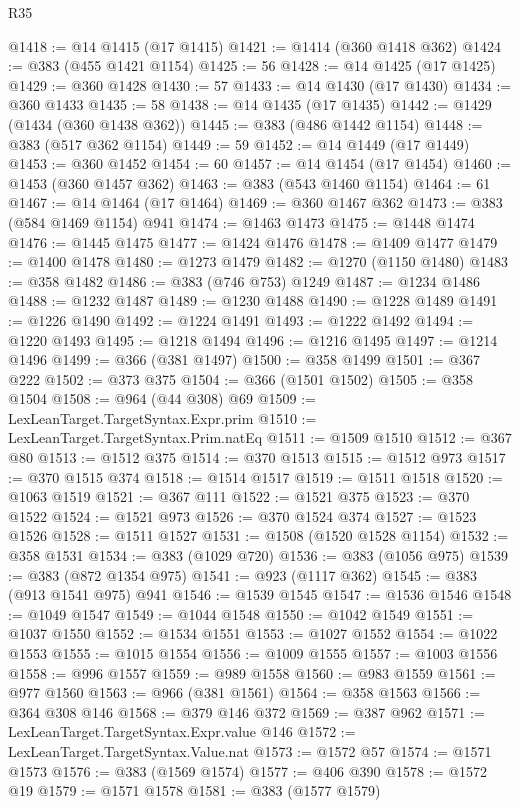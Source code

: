 \begin{lexlean}{R35}
\begin{coremodule}
{{{{{{{{{{{{{{{{{{{{{{{{{{{{{{{{{{{{{{{{{{{{{{{{{{{{@1418 := @14 @1415 (@17 @1415)
@1421 := @1414 (@360 @1418 @362)
@1424 := @383 (@455 @1421 @1154)
@1425 := 56
@1428 := @14 @1425 (@17 @1425)
@1429 := @360 @1428
@1430 := 57
@1433 := @14 @1430 (@17 @1430)
@1434 := @360 @1433
@1435 := 58
@1438 := @14 @1435 (@17 @1435)
@1442 := @1429 (@1434 (@360 @1438 @362))
@1445 := @383 (@486 @1442 @1154)
@1448 := @383 (@517 @362 @1154)
@1449 := 59
@1452 := @14 @1449 (@17 @1449)
@1453 := @360 @1452
@1454 := 60
@1457 := @14 @1454 (@17 @1454)
@1460 := @1453 (@360 @1457 @362)
@1463 := @383 (@543 @1460 @1154)
@1464 := 61
@1467 := @14 @1464 (@17 @1464)
@1469 := @360 @1467 @362
@1473 := @383 (@584 @1469 @1154) @941
@1474 := @1463 @1473
@1475 := @1448 @1474
@1476 := @1445 @1475
@1477 := @1424 @1476
@1478 := @1409 @1477
@1479 := @1400 @1478
@1480 := @1273 @1479
@1482 := @1270 (@1150 @1480)
@1483 := @358 @1482
@1486 := @383 (@746 @753) @1249
@1487 := @1234 @1486
@1488 := @1232 @1487
@1489 := @1230 @1488
@1490 := @1228 @1489
@1491 := @1226 @1490
@1492 := @1224 @1491
@1493 := @1222 @1492
@1494 := @1220 @1493
@1495 := @1218 @1494
@1496 := @1216 @1495
@1497 := @1214 @1496
@1499 := @366 (@381 @1497)
@1500 := @358 @1499
@1501 := @367 @222
@1502 := @373 @375
@1504 := @366 (@1501 @1502)
@1505 := @358 @1504
@1508 := @964 (@44 @308) @69
@1509 := LexLeanTarget.TargetSyntax.Expr.prim
@1510 := LexLeanTarget.TargetSyntax.Prim.natEq
@1511 := @1509 @1510
@1512 := @367 @80
@1513 := @1512 @375
@1514 := @370 @1513
@1515 := @1512 @973
@1517 := @370 @1515 @374
@1518 := @1514 @1517
@1519 := @1511 @1518
@1520 := @1063 @1519
@1521 := @367 @111
@1522 := @1521 @375
@1523 := @370 @1522
@1524 := @1521 @973
@1526 := @370 @1524 @374
@1527 := @1523 @1526
@1528 := @1511 @1527
@1531 := @1508 (@1520 @1528 @1154)
@1532 := @358 @1531
@1534 := @383 (@1029 @720)
@1536 := @383 (@1056 @975)
@1539 := @383 (@872 @1354 @975)
@1541 := @923 (@1117 @362)
@1545 := @383 (@913 @1541 @975) @941
@1546 := @1539 @1545
@1547 := @1536 @1546
@1548 := @1049 @1547
@1549 := @1044 @1548
@1550 := @1042 @1549
@1551 := @1037 @1550
@1552 := @1534 @1551
@1553 := @1027 @1552
@1554 := @1022 @1553
@1555 := @1015 @1554
@1556 := @1009 @1555
@1557 := @1003 @1556
@1558 := @996 @1557
@1559 := @989 @1558
@1560 := @983 @1559
@1561 := @977 @1560
@1563 := @966 (@381 @1561)
@1564 := @358 @1563
@1566 := @364 @308 @146
@1568 := @379 @146 @372
@1569 := @387 @962
@1571 := LexLeanTarget.TargetSyntax.Expr.value @146
@1572 := LexLeanTarget.TargetSyntax.Value.nat
@1573 := @1572 @57
@1574 := @1571 @1573
@1576 := @383 (@1569 @1574)
@1577 := @406 @390
@1578 := @1572 @19
@1579 := @1571 @1578
@1581 := @383 (@1577 @1579)
}}}}}}}}}}}}}}}}}}}}}}}}}}}}}}}}}}}}}}}}}}}}}}}}}}}}
\end{coremodule}
\end{lexlean}
